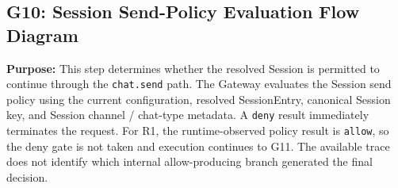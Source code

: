 
\subsection*{G10: Session Send-Policy Evaluation Flow Diagram}

\textbf{Purpose:}
This step determines whether the resolved Session is permitted to
continue through the \texttt{chat.send} path. The Gateway evaluates
the Session send policy using the current configuration, resolved
SessionEntry, canonical Session key, and Session channel / chat-type
metadata. A \texttt{deny} result immediately terminates the request.
For R1, the runtime-observed policy result is \texttt{allow}, so
the deny gate is not taken and execution continues to G11. The
available trace does not identify which internal allow-producing
branch generated the final decision.

